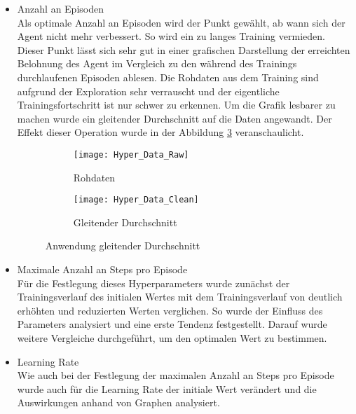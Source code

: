 \begin{itemize}
    \item Anzahl an Episoden\\
    Als optimale Anzahl an Episoden wird der Punkt gewählt, ab wann sich der Agent nicht mehr verbessert. So wird ein zu langes Training vermieden. 
    Dieser Punkt lässt sich sehr gut in einer grafischen Darstellung der erreichten Belohnung des Agent im Vergleich zu den während des Trainings durchlaufenen Episoden ablesen. 
    Die Rohdaten aus dem Training sind aufgrund der Exploration sehr verrauscht und der eigentliche Trainingsfortschritt ist nur schwer zu erkennen.
    Um die Grafik lesbarer zu machen wurde ein gleitender Durchschnitt auf die Daten angewandt. Der Effekt dieser Operation wurde in der Abbildung \ref{fig:NumOfEpisods_MovingAVG} veranschaulicht.

    \begin{figure}[H]
        \centering
        \begin{subfigure}{.5\textwidth}
          \centering
          \texttt{[image: Hyper\_Data\_Raw]}
          \caption{Rohdaten}
          \label{fig:NumOfEpisods_Raw}
        \end{subfigure}%
        \begin{subfigure}{.5\textwidth}
          \centering
          \texttt{[image: Hyper\_Data\_Clean]}
          \caption{Gleitender Durchschnitt}
          \label{fig:NumOfEpisods_clean}
        \end{subfigure}
        \caption{Anwendung gleitender Durchschnitt}
        \label{fig:NumOfEpisods_MovingAVG}
    \end{figure}

    \item Maximale Anzahl an Steps pro Episode\\
    Für die Festlegung dieses Hyperparameters wurde zunächst der Trainingsverlauf des initialen Wertes mit dem Trainingsverlauf von deutlich erhöhten und reduzierten Werten verglichen.
    So wurde der Einfluss des Parameters analysiert und eine erste Tendenz festgestellt.
    Darauf wurde weitere Vergleiche durchgeführt, um den optimalen Wert zu bestimmen.

    \item Learning Rate\\
    Wie auch bei der Festlegung der maximalen Anzahl an Steps pro Episode wurde auch für die Learning Rate der initiale Wert verändert und die Auswirkungen anhand von Graphen analysiert.


\end{itemize}
